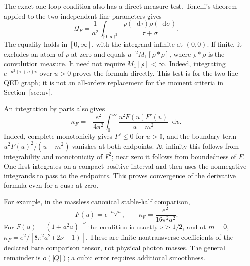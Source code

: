 \documentclass[final,5p,times,twocolumn,numbers,nopreprintline]{elsarticle}
\numberwithin{equation}{section}
\theoremstyle{definition}
\theoremstyle{remark}
\newcommand{\dd}{\mathop{}\!\mathrm d}
\begin{document}
The exact one-loop condition also has a direct measure test. Tonelli's
theorem applied to the two independent line parameters gives
\begin{equation}
 \mathcal Q_F=\frac1{a^2}
   \int_{[0,\infty)^2}
       \frac{\rho(\dd\tau)\rho(\dd\sigma)}{\tau+\sigma}.
 \label{eq:QED-convolution-moment}
\end{equation}
The equality holds in \([0,\infty]\), with the integrand infinite
at \((0,0)\). If finite, it excludes an atom of \(\rho\) at
zero and equals \(a^{-2}M_1[\rho*\rho]\), where \(\rho*\rho\)
is the convolution measure. It need not require \(M_1[\rho]<\infty\).
Indeed, integrating \(e^{-a^2(\tau+\sigma)u}\) over \(u>0\)
proves the formula directly. This test is for the two-line QED graph;
it is not an all-orders replacement for the moment criteria in
Section~\ref{sec:uv}.

An integration by parts also gives
\begin{equation}
 \kappa_F=-\frac{e^2}{4\pi^2}\int_0^\infty
                 \frac{u^2F(u)F'(u)}{u+m^2}\dd u.
 \label{eq:general-Ward-obstruction-derivative}
\end{equation}
Indeed, complete monotonicity gives \(F'\leq0\) for \(u>0\),
and the boundary term
\(u^2F(u)^2/(u+m^2)\) vanishes at both endpoints.
At infinity this follows from integrability and monotonicity of
\(F^2\); near zero it follows from boundedness of \(F\).
One first integrates on a compact positive interval and then uses
the nonnegative integrands to pass to the endpoints. This proves
convergence of the derivative formula even for a cusp at zero.

For example, in the massless canonical stable-half comparison,
\begin{equation}
 F(u)=e^{-a\sqrt u},\qquad
 \kappa_F=\frac{e^2}{16\pi^2a^2}.
 \label{eq:stable-half-Ward-coefficient}
\end{equation}
For \(F(u)=(1+a^2u)^{-\nu}\) the condition is exactly
\(\nu>1/2\), and at \(m=0\),
\(\kappa_F=e^2/[8\pi^2a^2(2\nu-1)]\).
These are finite nontransverse coefficients of the declared bare
comparison tensor, not physical photon masses. The general remainder
is \(o(|Q|)\); a cubic error requires additional smoothness.
\end{document}
